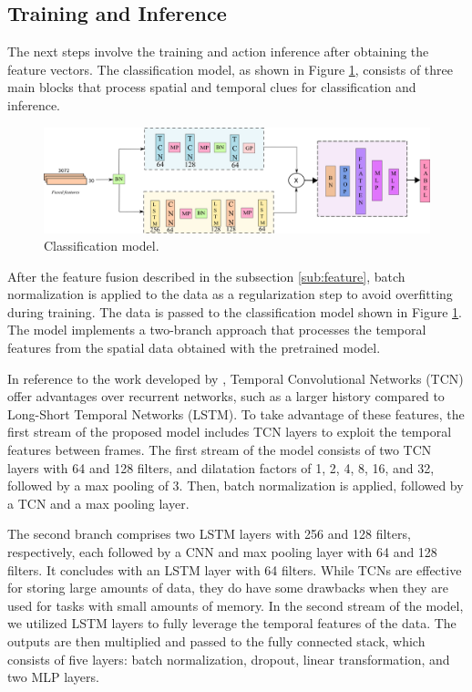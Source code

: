 \documentclass[mathematics,article,submit,pdftex,moreauthors]{Definitions/mdpi}
\begin{document}
\subsection{Training and Inference}
\label{sec:proposed_method}

The next steps involve the training and action inference after obtaining the feature vectors. The classification model, as shown in Figure \ref{fig:proposed_method}, consists of three main blocks that process spatial and temporal clues for classification and inference. 

\begin{figure}[!ht]
     \centering
     \includegraphics[width=1\textwidth]{Definitions/proposed_method.png}
     \caption{Classification model. \label{fig:proposed_method}}     
\end{figure}

After the feature fusion described in the subsection \ref{sub:feature}, batch normalization is applied to the data as a regularization step to avoid overfitting during training. The data is passed to the classification model shown in Figure \ref{fig:proposed_method}. The model implements a two-branch approach that processes the temporal features from the spatial data obtained with the pretrained model. 

In reference to the work developed by \cite{bai2018empirical}, Temporal Convolutional Networks (TCN) offer advantages over recurrent networks, such as a larger history compared to Long-Short Temporal Networks (LSTM). To take advantage of these features, the first stream of the proposed model includes TCN layers to exploit the temporal features between frames. The first stream of the model consists of two TCN layers with 64 and 128 filters, and dilatation factors of 1, 2, 4, 8, 16, and 32, followed by a max pooling of 3. Then, batch normalization is applied, followed by a TCN and a max pooling layer.

The second branch comprises two LSTM layers with 256 and 128 filters, respectively, each followed by a CNN and max pooling layer with 64 and 128 filters. It concludes with an LSTM layer with 64 filters. While TCNs are effective for storing large amounts of data, they do have some drawbacks when they are used for tasks with small amounts of memory. In the second stream of the model, we utilized LSTM layers to fully leverage the temporal features of the data. The outputs are then multiplied and passed to the fully connected stack, which consists of five layers: batch normalization, dropout, linear transformation, and two MLP layers.
\end{document}
